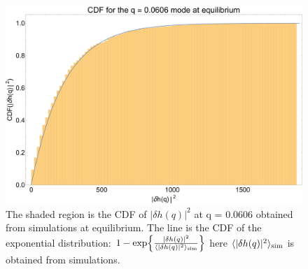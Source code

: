 \documentclass[amsmath,preprintnumbers,10pt,nofootinbib,prl,twocolumn]{revtex4-1}
\begin{document}
\begin{figure}
\centering
\includegraphics[scale=0.2]{Fig5.pdf}
\caption{The shaded region is the CDF of $|\delta h(q)|^2$ at q = 0.0606 obtained from simulations at equilibrium. The line is the CDF of the exponential distribution: $1-\exp{\frac{|\delta h(q)|^2}{\langle |\delta h(q)|^2\rangle_{\rm{sim}}}}$ here $\langle |\delta h(q)|^2\rangle_{\rm{sim}}$ is obtained from simulations. }  \label{fig:expdistributionateq}
\end{figure}
\end{document}

